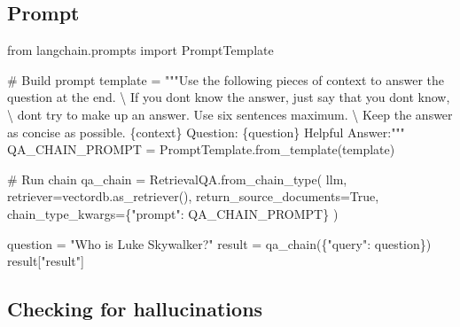 \documentclass[
  letterpaper,
  DIV=11,
  numbers=noendperiod]{scrreprt}
\newenvironment{Shaded}{\begin{snugshade}}{\end{snugshade}}
\newcommand{\CharTok}[1]{\textcolor[rgb]{0.13,0.47,0.30}{#1}}
\newcommand{\CommentTok}[1]{\textcolor[rgb]{0.37,0.37,0.37}{#1}}
\newcommand{\ImportTok}[1]{\textcolor[rgb]{0.00,0.46,0.62}{#1}}
\newcommand{\NormalTok}[1]{\textcolor[rgb]{0.00,0.23,0.31}{#1}}
\newcommand{\OperatorTok}[1]{\textcolor[rgb]{0.37,0.37,0.37}{#1}}
\newcommand{\SpecialCharTok}[1]{\textcolor[rgb]{0.37,0.37,0.37}{#1}}
\newcommand{\StringTok}[1]{\textcolor[rgb]{0.13,0.47,0.30}{#1}}
\newcommand{\VariableTok}[1]{\textcolor[rgb]{0.07,0.07,0.07}{#1}}
\begin{document}
\hypertarget{prompt-1}{%
\subsection{Prompt}\label{prompt-1}}

\begin{Shaded}
\begin{Highlighting}[]
\ImportTok{from}\NormalTok{ langchain.prompts }\ImportTok{import}\NormalTok{ PromptTemplate}

\CommentTok{\# Build prompt}
\NormalTok{template }\OperatorTok{=} \StringTok{"""Use the following pieces of context to answer the question at the end. }\CharTok{\textbackslash{}}
\StringTok{If you don\textquotesingle{}t know the answer, just say that you don\textquotesingle{}t know, }\CharTok{\textbackslash{}}
\StringTok{don\textquotesingle{}t try to make up an answer. Use six sentences maximum. }\CharTok{\textbackslash{}}
\StringTok{Keep the answer as concise as possible.}
\SpecialCharTok{\{context\}}
\StringTok{Question: }\SpecialCharTok{\{question\}}
\StringTok{Helpful Answer:"""}
\NormalTok{QA\_CHAIN\_PROMPT }\OperatorTok{=}\NormalTok{ PromptTemplate.from\_template(template)}
\end{Highlighting}
\end{Shaded}

\begin{Shaded}
\begin{Highlighting}[]
\CommentTok{\# Run chain}
\NormalTok{qa\_chain }\OperatorTok{=}\NormalTok{ RetrievalQA.from\_chain\_type(}
\NormalTok{    llm,}
\NormalTok{    retriever}\OperatorTok{=}\NormalTok{vectordb.as\_retriever(),}
\NormalTok{    return\_source\_documents}\OperatorTok{=}\VariableTok{True}\NormalTok{,}
\NormalTok{    chain\_type\_kwargs}\OperatorTok{=}\NormalTok{\{}\StringTok{"prompt"}\NormalTok{: QA\_CHAIN\_PROMPT\}}
\NormalTok{)}
\end{Highlighting}
\end{Shaded}

\begin{Shaded}
\begin{Highlighting}[]
\NormalTok{question }\OperatorTok{=} \StringTok{"Who is Luke Skywalker?"}
\NormalTok{result }\OperatorTok{=}\NormalTok{ qa\_chain(\{}\StringTok{"query"}\NormalTok{: question\})}
\NormalTok{result[}\StringTok{"result"}\NormalTok{]}
\end{Highlighting}
\end{Shaded}

\hypertarget{checking-for-hallucinations}{%
\subsection{Checking for
hallucinations}\label{checking-for-hallucinations}}
\end{document}
